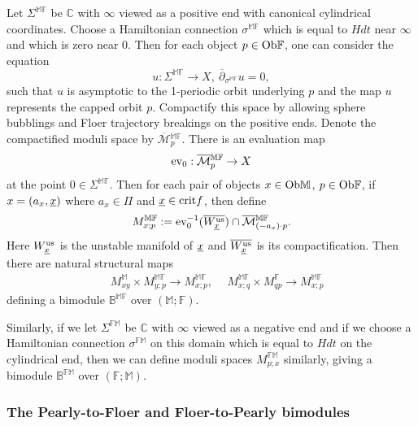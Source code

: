 \documentclass[reqno, 10pt]{amsart}
\numberwithin{equation}{section}
\numberwithin{equation}{section}
\theoremstyle{definition}
\theoremstyle{remark}
\newcommand{\beqn}{\begin{equation*}}
\newcommand{\eeqn}{\end{equation*}}
\newcommand{\ov}{\overline}
\newcommand{\mb}{\mathbb}
\newcommand{\mc}{\mathcal}
\newcommand{\uds}[1]{\underline{\smash{#1}}}
\newcommand{\ev}{{\rm ev}}
\begin{document}
Let $\Sigma^{\mb{MF}}$ be ${\mb C}$ with $\infty$ viewed as a positive end with canonical cylindrical coordinates. Choose a Hamiltonian connection $\sigma^{\mb{MF}}$ which is equal to $H dt$ near $\infty$ and which is zero near $0$. Then for each object $p \in {\rm Ob}{\mb F}$, one can consider the equation 
\beqn
u: \Sigma^{\mb{MF}} \to X,\ \ov\partial_{\sigma^{\mb{MF}}} u = 0,
\eeqn
such that $u$ is asymptotic to the 1-periodic orbit underlying $p$ and the map $u$ represents the capped orbit $p$. Compactify this space by allowing sphere bubblings and Floer trajectory breakings on the positive ends. Denote the compactified moduli space by $\ov{\mc M}{}_p^{\mb{MF}}$. There is an evaluation map 
\beqn
\ev_0: \ov{\mc M}{}_p^{\mb{MF}} \to X
\eeqn
at the point $0 \in \Sigma^{\mb{MF}}$. Then for each pair of objects $x \in {\rm Ob}{\mb M}$, $p \in {\rm Ob}{\mb F}$, if $x = (a_x, \uds x)$ where $a_x \in \Pi$ and $\uds x \in {\rm crit} f$, then define
\beqn
M_{x; p}^{\mb{MF}}:= \ev_0^{-1}(\ov{W_{\uds x}^{\rm us}}) \cap \ov{\mc M}{}_{(-a_x)\cdot p}^{\mb{MF}}.
\eeqn
Here $W_{\uds x}^{\rm us}$ is the unstable manifold of $\uds x$ and $\ov{W_{\uds x}^{\rm us}}$ is its compactification. Then there are natural structural maps
\begin{align*}
&\ M_{xy}^{\mb{M}} \times M_{y;p}^{\mb{MF}} \to M_{x; p}^{\mb{MF}},\ &\ M_{x; q}^{\mb{MF}} \times M_{qp}^{\mb{F}} \to M_{x; p}^{\mb{MF}}
\end{align*}
defining a bimodule $\mb{B}^{\mb{MF}}$ over $({\mb M}; {\mb F})$.

Similarly, if we let $\Sigma^{\mb{FM}}$ be ${\mb C}$ with $\infty$ viewed as a negative end and if we choose a Hamiltonian connection $\sigma^{\mb{FM}}$ on this domain which is equal to $H dt$ on the cylindrical end, then we can define moduli spaces $M_{p;x}^{\mb{FM}}$ similarly, giving a bimodule ${\mb B}^{\mb{FM}}$ over $({\mb F};  {\mb M})$.


\subsubsection{The Pearly-to-Floer and Floer-to-Pearly bimodules}
\end{document}
